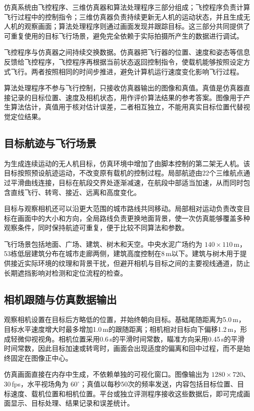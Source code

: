 仿真系统由飞控程序、三维仿真器和算法处理程序三部分组成；飞控程序负责计算飞行过程中的控制指令；三维仿真器负责持续更新无人机的运动状态，并且生成无人机的观察画面；算法处理程序则通过画面发现并跟踪目标。这三部分共同提供了可重复使用的目标飞行场景，避免完全依赖于实际拍摄所产生的数据进行调试。

飞控程序与仿真器之间持续交换数据。仿真器把飞行器的位置、速度和姿态等信息反馈给飞控程序，飞控程序再根据当前状态返回控制指令，使载机能够按照设定方式飞行。两者按照相同的时间步推进，避免计算机运行速度变化影响飞行过程。

算法处理程序不参与飞行控制，只接收仿真器输出的图像和真值。真值是仿真器直接记录的目标位置、速度及相机状态，用作评价算法结果的参考答案。图像用于产生算法估计，真值用于核对估计误差，二者相互独立，不能用真实目标位置代替视觉定位结果。

\subsection{目标航迹与飞行场景}

为生成连续运动的无人机目标，仿真环境中增加了由脚本控制的第二架无人机。该目标按照预设航迹运动，不改变原有载机的控制过程。局部航迹由22个三维航点通过平滑曲线连接，目标在航段交界处逐渐减速，在航段中部适当加速，从而同时包含直线飞行、转弯、接近、远离和高度变化。

目标与观察相机还可以沿更大范围的城市路线共同移动。局部相对运动负责改变目标在画面中的大小和方向，全局路线负责更换地面背景，使一次仿真能够覆盖多种观察条件，同时保持航迹可重复，便于比较不同算法和参数。

飞行场景包括地面、广场、建筑、树木和天空。中央水泥广场约为 $140\times110$\,m，53栋低层建筑分布在城市走廊两侧，建筑高度控制在8\,m以下。建筑与树木用于提供接近实际环境的纹理和背景干扰，但避开相机与目标之间的主要视线通道，防止长期遮挡影响对检测和定位流程的检查。

\subsection{相机跟随与仿真数据输出}

观察相机设置在目标后方略低的位置，并始终朝向目标。基础尾随距离为5.0\,m，目标水平速度增大时最多增加1.0\,m的跟随距离；相机相对目标向下偏移1.2\,m，形成轻微仰视视角。相机位置采用0.6\,s的平滑时间常数，瞄准方向采用0.45\,s的平滑时间常数，因此目标加速或转弯时，画面会出现适度的偏离和回中过程，而不是始终固定在图像正中心。

仿真画面直接在内存中生成，不依赖单独的可视化窗口。图像输出为 $1280\times720$、30\,fps，水平视场角为 $60^{\circ}$；真值以每秒50次的频率发送，内容包括目标位置、目标速度、载机位置和相机位置。平台或独立评测程序接收这些数据后，即可完成画面显示、目标处理、结果记录和误差统计。

